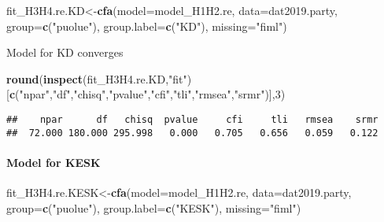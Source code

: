 \documentclass[
]{article}
\newenvironment{Shaded}{\begin{snugshade}}{\end{snugshade}}
\newcommand{\DataTypeTok}[1]{\textcolor[rgb]{0.13,0.29,0.53}{#1}}
\newcommand{\DecValTok}[1]{\textcolor[rgb]{0.00,0.00,0.81}{#1}}
\newcommand{\KeywordTok}[1]{\textcolor[rgb]{0.13,0.29,0.53}{\textbf{#1}}}
\newcommand{\NormalTok}[1]{#1}
\newcommand{\StringTok}[1]{\textcolor[rgb]{0.31,0.60,0.02}{#1}}
\begin{document}
\begin{Shaded}
\begin{Highlighting}[]
\NormalTok{fit_H3H4.re.KD<-}\KeywordTok{cfa}\NormalTok{(}\DataTypeTok{model=}\NormalTok{model_H1H2.re,}
                    \DataTypeTok{data=}\NormalTok{dat2019.party,}
                    \DataTypeTok{group=}\KeywordTok{c}\NormalTok{(}\StringTok{"puolue"}\NormalTok{),}
                    \DataTypeTok{group.label=}\KeywordTok{c}\NormalTok{(}\StringTok{"KD"}\NormalTok{),}
                    \DataTypeTok{missing=}\StringTok{"fiml"}\NormalTok{)}
\end{Highlighting}
\end{Shaded}

Model for KD converges

\begin{Shaded}
\begin{Highlighting}[]
\KeywordTok{round}\NormalTok{(}\KeywordTok{inspect}\NormalTok{(fit_H3H4.re.KD,}\StringTok{"fit"}\NormalTok{)}
\NormalTok{      [}\KeywordTok{c}\NormalTok{(}\StringTok{"npar"}\NormalTok{,}\StringTok{"df"}\NormalTok{,}\StringTok{"chisq"}\NormalTok{,}\StringTok{"pvalue"}\NormalTok{,}\StringTok{"cfi"}\NormalTok{,}\StringTok{"tli"}\NormalTok{,}\StringTok{"rmsea"}\NormalTok{,}\StringTok{"srmr"}\NormalTok{)],}\DecValTok{3}\NormalTok{)}
\end{Highlighting}
\end{Shaded}

\begin{verbatim}
##    npar      df   chisq  pvalue     cfi     tli   rmsea    srmr 
##  72.000 180.000 295.998   0.000   0.705   0.656   0.059   0.122
\end{verbatim}

\newpage

\hypertarget{model-for-kesk}{%
\paragraph{Model for KESK}\label{model-for-kesk}}

\begin{Shaded}
\begin{Highlighting}[]
\NormalTok{fit_H3H4.re.KESK<-}\KeywordTok{cfa}\NormalTok{(}\DataTypeTok{model=}\NormalTok{model_H1H2.re,}
                    \DataTypeTok{data=}\NormalTok{dat2019.party,}
                    \DataTypeTok{group=}\KeywordTok{c}\NormalTok{(}\StringTok{"puolue"}\NormalTok{),}
                    \DataTypeTok{group.label=}\KeywordTok{c}\NormalTok{(}\StringTok{"KESK"}\NormalTok{),}
                    \DataTypeTok{missing=}\StringTok{"fiml"}\NormalTok{)}
\end{Highlighting}
\end{Shaded}
\end{document}
